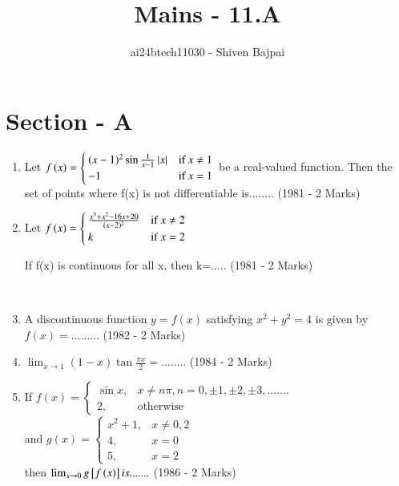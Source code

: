 \documentclass[journal]{IEEEtran}
\begin{document}
\onecolumn

\vspace{3cm}

\renewcommand{\thefigure}{\theenumi}
\renewcommand{\thetable}{\theenumi}

\title{Mains - 11.A}
\author{ai24btech11030 - Shiven Bajpai}
\maketitle

\section*{Section - A}
\begin{enumerate}
\item{ 
    Let $f\left(x\right)= \begin{cases}
	   (x-1)^2 \sin\frac{1}{x-1}\left\vert x\right\vert & \text{if} \: x\ne1 \\
      -1 & \text{if} \: x = 1 
    \end{cases} $
    be a real-valued function. Then the set of points where f(x) is not differentiable is........ \hfill (1981 - 2 Marks)
}\\

\item{
    Let $f\left(x\right)= \begin{cases}
    \frac{x^3+x^2-16x+20}{(x-2)^2}& \text{if } x \ne 2\\
    k& \text{if } x = 2
    \end{cases}$
    
    If f(x) is continuous for all x, then k=..... \hfill(1981 - 2 Marks)
}\\


\item{
    A discontinuous function $y=f(x)$ satisfying $x^2 + y^2 = 4$ is given by $f(x)=$......... \hfill (1982 - 2 Marks)
}\\

\item {
    $\lim_{x\to1} (1-x) \tan\frac{\pi x}{2} = $........ \hfill (1984 - 2 Marks)
}\\
    
\item {
    If $f(x)= \begin{cases}\sin x,& x \ne n\pi, n = 0, \pm1, \pm2, \pm3, ....... \\
    2,& \text{otherwise}\end{cases}$\\
    and $g(x) = \begin{cases}x^2 + 1,& x \ne 0, 2\\
    4,& x=0\\
    5,& x=2\end{cases}$\\
    then $\lim_{x\to0} g{}\left[f\left(x\right)\right] is .......$ \hfill(1986 - 2 Marks)
}\\


\end{enumerate}
\end{document}
